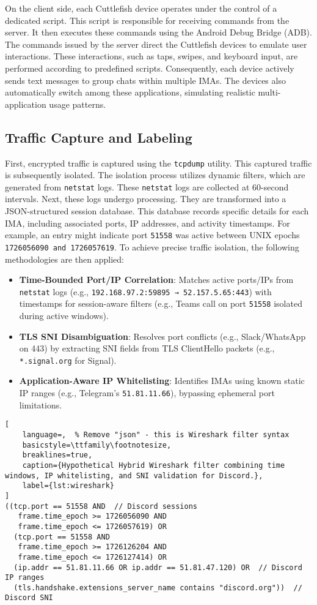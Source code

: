 \documentclass[conference]{IEEEtran}
\begin{document}
On the client side, each Cuttlefish device operates under the control of a dedicated script. This script is responsible for receiving commands from the server. It then executes these commands using the Android Debug Bridge (ADB). The commands issued by the server direct the Cuttlefish devices to emulate user interactions. These interactions, such as taps, swipes, and keyboard input, are performed according to predefined scripts. Consequently, each device actively sends text messages to group chats within multiple IMAs. The devices also automatically switch among these applications, simulating realistic multi-application usage patterns. 

\subsection{Traffic Capture and Labeling}
First, encrypted traffic is captured using the \texttt{tcpdump} utility. This captured traffic is subsequently isolated. The isolation process utilizes dynamic filters, which are generated from \texttt{netstat} logs. These \texttt{netstat} logs are collected at 60-second intervals. Next, these logs undergo processing. They are transformed into a JSON-structured session database. This database records specific details for each IMA, including associated ports, IP addresses, and activity timestamps. For example, an entry might indicate port \texttt{51558} was active between UNIX epochs \texttt{1726056090 and 1726057619}. To achieve precise traffic isolation, the following methodologies are then applied:

\begin{itemize}
    \item \textbf{Time-Bounded Port/IP Correlation}: Matches active ports/IPs from \texttt{netstat} logs (e.g., \texttt{192.168.97.2:59895 → 52.157.5.65:443}) with timestamps for session-aware filters (e.g., Teams call on port \texttt{51558} isolated during active windows).
    \item \textbf{TLS SNI Disambiguation}: Resolves port conflicts (e.g., Slack/WhatsApp on 443) by extracting SNI fields from TLS ClientHello packets (e.g., \texttt{*.signal.org} for Signal).
    \item \textbf{Application-Aware IP Whitelisting}: Identifies IMAs using known static IP ranges (e.g., Telegram's \texttt{51.81.11.66}), bypassing ephemeral port limitations.
\end{itemize}

\begin{lstlisting}[
    language=,  % Remove "json" - this is Wireshark filter syntax
    basicstyle=\ttfamily\footnotesize,
    breaklines=true,
    caption={Hypothetical Hybrid Wireshark filter combining time windows, IP whitelisting, and SNI validation for Discord.},
    label={lst:wireshark}
]
((tcp.port == 51558 AND  // Discord sessions
   frame.time_epoch >= 1726056090 AND 
   frame.time_epoch <= 1726057619) OR
  (tcp.port == 51558 AND 
   frame.time_epoch >= 1726126204 AND 
   frame.time_epoch <= 1726127414) OR
  (ip.addr == 51.81.11.66 OR ip.addr == 51.81.47.120) OR  // Discord IP ranges
  (tls.handshake.extensions_server_name contains "discord.org"))  // Discord SNI
\end{lstlisting}
\end{document}
